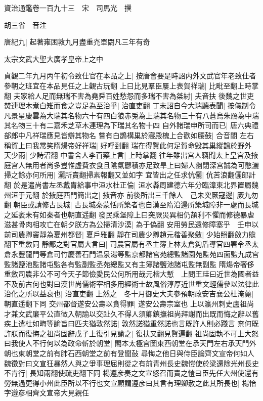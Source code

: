 資治通鑑卷一百九十三　宋　司馬光　撰

胡三省　音注

唐紀九|{
	起著雍困敦九月盡重灮單閼凡三年有奇}


太宗文武大聖大廣孝皇帝上之中

貞觀二年九月丙午初令致仕官在本品之上|{
	按唐會要是時詔内外文武官年老致仕者參朝之班宜在本品見任之上觀古玩翻}
上曰比見羣臣屢上表賀祥瑞|{
	比毗至翻上時掌翻}
夫家給人足而無瑞不害為堯舜百姓愁怨而多瑞不害為桀紂|{
	夫音扶}
後魏之世吏焚連理木煮白雉而食之豈足為至治乎|{
	治直吏翻}
丁未詔自今大瑞聽表聞|{
	按儀制令凡景星慶雲為大瑞其名物六十有四白狼赤兎為上瑞其名物三十有八蒼烏朱鴈為中瑞其名物三十有二嘉禾芝草木連理為下瑞其名物十四}
自外諸瑞申所司而已|{
	唐六典禮部郎中凡祥瑞應見皆辯其物名}
嘗有白鵲構巢於寢殿槐上合歡如腰鼓|{
	合音閤}
左右稱賀上曰我常笑隋煬帝好祥瑞|{
	好呼到翻}
瑞在得賢此何足賀命毁其巢縱鵲於野外　天少雨|{
	少詩沼翻}
中書舍人李百藥上言|{
	上時掌翻}
往年雖出宫人竊聞太上皇宫及掖庭宫人無用者尚多豈惟虚費衣食且隂氣鬱積亦足致旱上曰婦人幽閉深宫誠為可愍灑掃之餘亦何所用|{
	灑所賣翻掃素報翻又並如字}
宜皆出之任求伉儷|{
	伉苦浪翻儷郎計翻}
於是遣尚書左丞戴胄給事中洹水杜正倫|{
	洹水縣周建德六年分臨漳東北界置屬魏州洹于元翻}
於掖庭西門簡出之|{
	掖音亦}
前後所出三千餘人　己未突厥寇邊|{
	厥九勿翻}
朝臣或請修古長城|{
	古長城秦蒙恬所築者也自漢至隋沿邊所築城障非一處而長城之延袤未有如秦者也朝直遥翻}
發民乘堡障上曰突厥災異相仍頡利不懼而修德暴虐滋甚骨肉相攻亡在朝夕朕方為公掃清沙漠|{
	為于偽翻}
安用勞民遠修障塞乎　壬申以前司農卿竇靜為夏州都督|{
	夏戶雅翻}
靜在司農少卿趙元楷善聚斂|{
	少始照翻斂力贍翻下重斂同}
靜鄙之對官屬大言曰|{
	司農官屬有丞主簿上林太倉鉤盾導官四署令丞太倉永豐龍門等倉司竹慶善石門温泉湯等監京都諸宫苑總監諸園苑監苑四面監九成宫監諸鹽池監諸屯監各有監副監丞苑總監又有主簿諸鹽池諸屯監無副監}
隋煬帝奢侈重斂司農非公不可今天子節儉愛民公何所用哉元楷大慙　上問王珪曰近世為國者益不及前古何也對曰漢世尚儒術宰相多用經術士故風俗淳厚近世重文輕儒參以法律此治化之所以益衰也|{
	治直吏翻}
上然之　冬十月御史大夫參預朝政安吉襄公杜淹薨|{
	朝直遥翻下同}
交州都督遂安公壽以貪得罪|{
	遂安公壽宗室也}
上以瀛州刺史盧祖尚才兼文武廉平公直徵入朝諭以交趾久不得人須卿鎮撫祖尚拜謝而出既而悔之辭以舊疾上遣杜如晦等諭旨曰匹夫猶敦然諾|{
	敦然諾猶重然諾也言既許人則必踐言}
柰何既許朕而復悔之祖尚固辭戊子上復引見諭之|{
	復扶又翻見賢遍翻}
祖尚固執不可上大怒曰我使人不行何以為政命斬於朝堂|{
	閣本太極宫圖東西朝堂在承天門左右承天門外朝也東朝堂之前有肺石西朝堂之前有登聞鼔}
尋悔之他日與侍臣論齊文宣帝何如人魏徵對曰文宣狂暴然人與之爭事理屈則從之有前青州長史魏愷使於梁還除光州長史不肯行|{
	長知兩翻使疏吏翻下同}
楊遵彦奏之文宣怒召而責之愷曰臣先任大州使還有勞無過更得小州此臣所以不行也文宣顧謂遵彦曰其言有理卿赦之此其所長也|{
	楊愔字遵彦相齊文宣帝大見親任}
